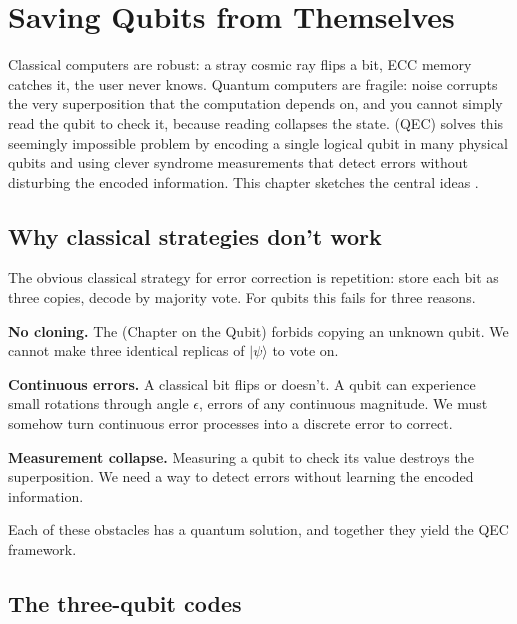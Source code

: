 \chapter{Saving Qubits from Themselves}


Classical computers are robust: a stray cosmic ray flips a bit, ECC memory catches it, the user never knows. Quantum computers are fragile: noise corrupts the very superposition that the computation depends on, and you cannot simply read the qubit to check it, because reading collapses the state.  (QEC) solves this seemingly impossible problem by encoding a single logical qubit in many physical qubits and using clever syndrome measurements that detect errors without disturbing the encoded information. This chapter sketches the central ideas \citep{nielsen_quantum_2010,fowler_surface_2012}.

\section{Why classical strategies don't work}

The obvious classical strategy for error correction is repetition: store each bit as three copies, decode by majority vote. For qubits this fails for three reasons.

\textbf{No cloning.} The  (Chapter on the Qubit) forbids copying an unknown qubit. We cannot make three identical replicas of $|\psi\rangle$ to vote on.

\textbf{Continuous errors.} A classical bit flips or doesn't. A qubit can experience small rotations through angle $\epsilon$, errors of any continuous magnitude. We must somehow turn continuous error processes into a discrete error to correct.

\textbf{Measurement collapse.} Measuring a qubit to check its value destroys the superposition. We need a way to detect errors without learning the encoded information.

Each of these obstacles has a quantum solution, and together they yield the QEC framework.

\section{The three-qubit codes}

